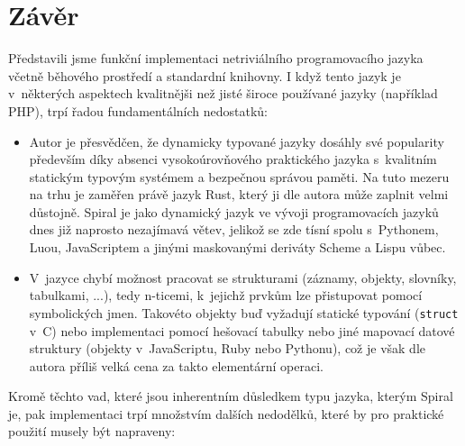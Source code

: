 \chapter{Závěr}

Představili jsme funkční implementaci netriviálního programovacího jazyka včetně
běhového prostředí a standardní knihovny. I když tento jazyk je v~některých
aspektech kvalitnějši než jisté široce používané jazyky (například 
PHP), trpí řadou fundamentálních nedostatků:

\begin{itemize}
  \item Autor je přesvědčen, že dynamicky typované jazyky dosáhly své popularity
    především díky absenci vysokoúrovňového praktického jazyka s~kvalitním
    statickým typovým systémem a bezpečnou správou paměti. Na tuto mezeru na
    trhu je zaměřen právě jazyk Rust, který ji dle autora může zaplnit velmi
    důstojně. Spiral je jako dynamický jazyk ve vývoji programovacích jazyků
    dnes již naprosto nezajímavá větev, jelikož se zde tísní spolu s~Pythonem,
    Luou, JavaScriptem a jinými maskovanými deriváty Scheme a Lispu vůbec.

  \item V~jazyce chybí možnost pracovat se strukturami (záznamy, objekty,
    slovníky, tabulkami, ...), tedy n-ticemi, k~jejichž prvkům lze přistupovat
    pomocí symbolických jmen. Takovéto objekty buď vyžadují statické typování
    (\texttt{struct} v~C) nebo implementaci pomocí hešovací tabulky nebo jiné
    mapovací datové struktury (objekty v~JavaScriptu, Ruby nebo Pythonu), což je
    však dle autora příliš velká cena za takto elementární operaci.
\end{itemize}

Kromě těchto vad, které jsou inherentním důsledkem typu jazyka, kterým Spiral
je, pak implementaci trpí množstvím dalších nedodělků, které by pro praktické
použití musely být napraveny:

